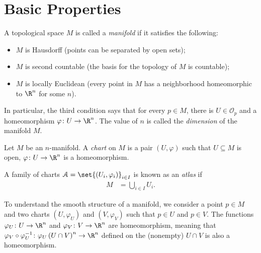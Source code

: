\documentclass[10pt]{mypackage}
\begin{document}
\RaggedRight
\section{Basic Properties}%
\begin{definition}
  A topological space $M$ is called a \textit{manifold} if it satisfies the following:
  \begin{itemize}
    \item $M$ is Hausdorff (points can be separated by open sets);
    \item $M$ is second countable (the basis for the topology of $M$ is countable);
    \item $M$ is locally Euclidean (every point in $M$ has a neighborhood homeomorphic to $\R^n$ for some $n$).
  \end{itemize}
  In particular, the third condition says that for every $p\in M$, there is $U\in \mathcal{O}_p$ and a homeomorphism $\varphi\colon U\rightarrow \R^n$. The value of $n$ is called the \textit{dimension} of the manifold $M$.
\end{definition}
\begin{definition}
  Let $M$ be an $n$-manifold. A \textit{chart} on $M$ is a pair $\left( U,\varphi \right)$ such that $U\subseteq M$ is open, $\varphi\colon U\rightarrow \R^n$ is a homeomorphism.\newline

  A family of charts $\mathcal{A} = \set{\left( U_i,\varphi_i \right)}_{i\in I}$ is known as an \textit{atlas} if
  \begin{align*}
    M &= \bigcup_{i\in I} U_i.
  \end{align*}
\end{definition}
To understand the smooth structure of a manifold, we consider a point $p\in M$ and two charts $\left( U,\varphi_U \right)$ and $\left( V,\varphi_V \right)$ such that $p\in U$ and $p\in V$. The functions $\varphi_U\colon U\rightarrow \R^n$ and $\varphi_V\colon V\rightarrow \R^n$ are homeomorphism, meaning that $\varphi_V\circ\varphi_U^{-1}\colon \varphi_{U}\left( U\cap V \right)^n\rightarrow \R^n$ defined on the (nonempty) $U\cap V$ is also a homeomorphism.\newline
\end{document}

